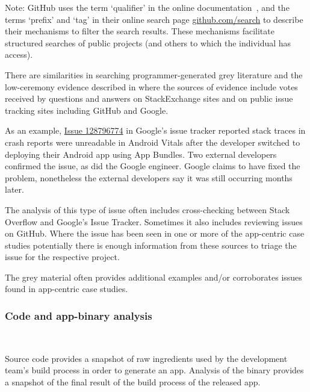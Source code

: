 \begin{kaobox}[frametitle=Inconsistent terms for searches on GitHub]
Note: GitHub uses the term `qualifier' in the online documentation~, and the terms `prefix' and `tag' in their online search page \href{https://github.com/search}{github.com/search} to describe their mechanisms to filter the search results. These mechanisms facilitate structured searches of public projects (and others to which the individual has access).
\end{kaobox}


There are similarities in searching programmer-generated grey literature and the low-ceremony evidence described in  where the sources of evidence include votes received by questions and answers on StackExchange sites and on public issue tracking sites including GitHub and Google. %

As an example, \href{https://issuetracker.google.com/issues/128796774}{Issue 128796774} in Google's issue tracker reported stack traces in crash reports were unreadable in Android Vitals after the developer switched to deploying their Android app using App Bundles. Two external developers confirmed the issue, as did the Google engineer. Google claims to have fixed the problem, nonetheless the external developers say it was still occurring months later.

The analysis of this type of issue often includes cross-checking between Stack Overflow and Google's Issue Tracker. Sometimes it also includes reviewing issues on GitHub. Where the issue has been seen in one or more of the app-centric case studies potentially there is enough information from these sources to triage the issue for the respective project.

The grey material often provides additional examples and/or corroborates issues found in app-centric case studies.

\subsubsection{Code and app-binary analysis}~\label{section-code-analysis-research-method}   


Source code provides a snapshot of raw ingredients used by the development team's build process in order to generate an app. Analysis of the binary provides a snapshot of the final result of the build process of the released app.

